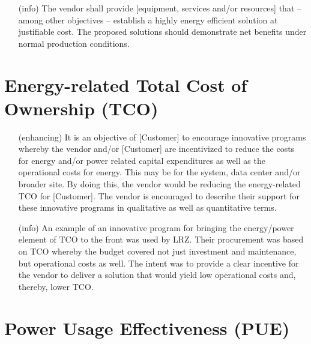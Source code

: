 \begin{itemize}

\item[(info)]
The vendor shall provide [equipment, services and/or resources] that – among other objectives – establish a highly energy efficient solution at justifiable cost.  The proposed solutions should demonstrate net benefits under normal production conditions.  
\end{itemize}

\section{Energy-related Total Cost of Ownership (TCO)}

\begin{itemize}

\item[(enhancing)]
It is an objective of [Customer] to encourage innovative programs whereby the vendor and/or [Customer] are incentivized to reduce the costs for energy and/or power related capital expenditures as well as the operational costs for energy.  This may be for the system, data center and/or broader site.  By doing this, the vendor would be reducing the energy-related TCO for [Customer].  The vendor is encouraged to describe their support for these innovative programs in qualitative as well as quantitative terms.

\item[(info)]
An example of an innovative program for bringing the energy/power element of TCO to the front was used by LRZ.  Their procurement was based on TCO whereby the budget covered not just investment and maintenance, but operational costs as well. The intent was to provide a clear incentive for the vendor to deliver a solution that would yield low operational costs and, thereby, lower TCO.

\end{itemize}

\section{Power Usage Effectiveness (PUE)}

